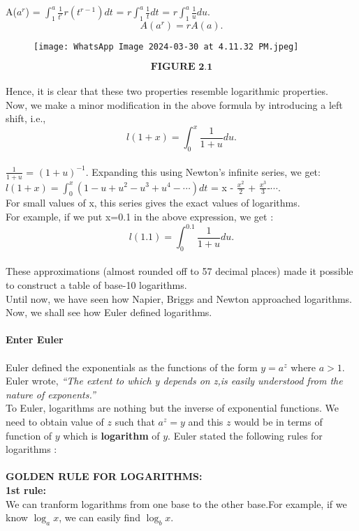 \documentclass[a4paper,11pt]{article}
\begin{document}
A($a^r$) = $\int_{1}^{a}\frac{1}{t^r}r(t^{r-1})dt$ = $r\int_{1}^{a}\frac{1}{t}dt$ = $r\int_{1}^{a}\frac{1}{u}du.$\\
$$\textbf{$A(a^r) = rA(a).$}$$
\begin{figure}
   \centering
   \texttt{[image: WhatsApp Image 2024-03-30 at 4.11.32 PM.jpeg]}
\end{figure}
$$ \textbf{FIGURE 2.1}$$
\\
Hence, it is clear that these two properties resemble logarithmic properties.\\
Now, we make a minor modification in the above formula by introducing a left shift, i.e.,\\
$$\textbf{$l(1+x) = \int_{0}^{x}\frac{1}{1+u}du$.}$$\\
$\frac{1}{1+u}$ = $(1+u)^{-1}$. Expanding this using Newton's infinite series, we get:
$l(1+x) = \int_{0}^{x}(1-u+u^2-u^3+u^4-\cdots)dt$ = x - $ \frac{x^2}{2} $ + $\frac{x^3}{3}$-$\cdots.$\\
For small values of x, this series gives the exact values of logarithms.\\
For example, if we put x=0.1 in the above expression, we get :\\
$$\textbf{$l(1.1)=\int_{0}^{0.1}\frac{1}{1+u}du.$}$$\\
These approximations (almost rounded off to 57 decimal places) made it possible to construct a table of base-10 logarithms.\\
Until now, we have seen how Napier, Briggs and Newton approached logarithms.
Now, we shall see how Euler defined logarithms.\\
\\
\textbf{Enter Euler}\\
\\
Euler defined the exponentials as the functions 
of the form $y = a^z$ where $a>1.$\\
Euler wrote,
\textit{``The extent to which y depends on z,is easily understood from 
the nature of exponents.''}\\
To Euler, logarithms are nothing but the inverse of exponential functions.
We need to obtain value of $z$ such that $a^z = y$ and this $z$ would be in terms of function of $y$ which is \textbf{logarithm} of $y$. Euler stated the following rules for logarithms :\\
\\
\textbf{GOLDEN RULE FOR LOGARITHMS:}\\
\textbf{1st rule:}\\
We can tranform logarithms from one base to the other base.For example, if we know $\log_ax$, we can easily find $\log_bx$.\\
\end{document}
